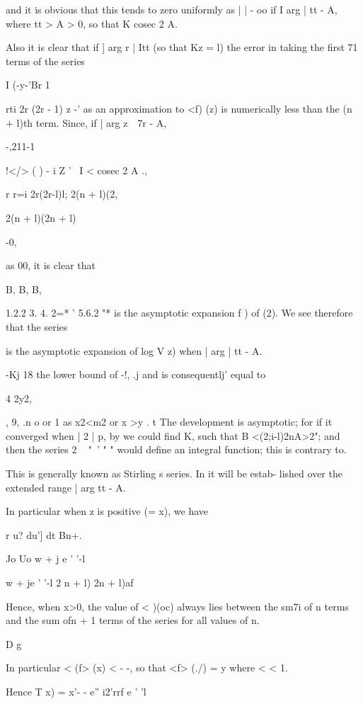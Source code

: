 and it is obvious that this tends to zero uniformly as | | - oo if I
arg | tt - A, where tt > A > 0, so that K cosec 2 A.

Also it is clear that if ] arg r | Itt (so that Kz = l) the error in
taking the first 71 terms of the series

I (-y-'Br 1

rti 2r (2r - 1) z -' as an approximation to <f) (z) is numerically
less than the (n + l)th term. Since, if | arg z\ \ 7r - A,

-,211-1

!</> ( ) - i Z ' \ I < cosec 2 A .,

r r=i 2r(2r-l)l; 2(n + l)(2,

2(n + l)(2n + l)

-0,

as 00, it is clear that

B, B, B,

1.2.2 3. 4. 2=* ' 5.6.2 "* is the asymptotic expansion f ) of
(2). We see therefore that the series

is the asymptotic expansion of log V z) when | arg | tt - A.

-Kj 18 the lower bound of -!, .j and is consequentlj' equal to

4 2y2,

, 9, .n o or 1 as x2<m2 or x >y . t The development is asymptotic;
for if it converged when | 2 | p, by we could find K, such that
B <(2;i-l)2nA>2"; and then the series 2 ~ "~' " " would define an
integral function; this is contrary to.

%
%

This is generally known as Stirling s series. In it will be
estab- lished over the extended range | arg tt - A.

In particular when z is positive (= x), we have

r u? du'] dt Bn+.

Jo Uo w + j e ' '-l

w + je ' '-l 2 n + l) 2n + l)af

Hence, when x>0, the value of < )(oc) always lies between the sm7i of
n terms and the sum ofn + 1 terms of the series for all values of n.

D g

In particular < (f> (x) < - -, so that <f> (./) = y where < < 1.

Hence T x) = x'- - e'' i2'rrf e ' 'l

